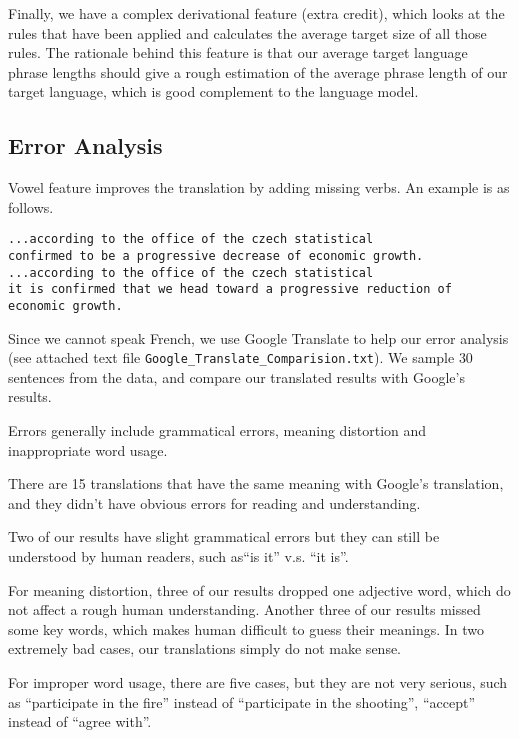 \documentclass[letterpaper]{article}
\begin{document}
\vspace{0.1cm}
Finally, we have a complex derivational feature (extra credit), which looks at the rules that have been applied and calculates the average target size of all those rules. The rationale behind this feature is that our average target language phrase lengths should give a rough estimation of the average phrase length of our target language, which is good complement to the language model.

\subsection{Error Analysis}
Vowel feature improves the translation by adding missing verbs. An example is as follows.
\begin{verbatim}
...according to the office of the czech statistical 
confirmed to be a progressive decrease of economic growth.
...according to the office of the czech statistical
it is confirmed that we head toward a progressive reduction of economic growth.
\end{verbatim}

Since we cannot speak French, we use Google Translate to help our error analysis (see attached text file \texttt{Google\_Translate\_Comparision.txt}). We sample $30$ sentences from the data, and compare
our translated results with Google's results.

Errors generally include grammatical errors, meaning distortion and inappropriate word usage.

There are 15 translations that have the same meaning with Google's translation, and they didn't have obvious errors for reading and understanding.

Two of our results have slight grammatical errors but they can still be understood by human readers, such as``is it'' v.s. ``it is''.

For meaning distortion, three of our results dropped one adjective word, which do not affect a rough human understanding. Another three of our results missed some key words, which makes human difficult to guess their meanings. In two extremely bad cases, our translations simply do not make sense.

For improper word usage, there are five cases, but they are not very serious, such as ``participate in the fire'' instead of ``participate in the shooting'', ``accept'' instead of ``agree with''.




\end{document}
